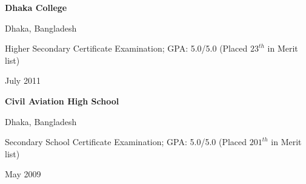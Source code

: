 	  \begin{minipage}{.75\linewidth} \begin{flushleft}
    		\textbf{Dhaka College}
    	\end{flushleft} \end{minipage}
    \hfill 
    \begin{minipage}{.20\linewidth}\begin{flushright}
    	 Dhaka, Bangladesh
    	\end{flushright}\end{minipage}
    	 \vspace{2pt}
    	\begin{minipage}{.75\linewidth} \begin{flushleft}
    		Higher Secondary Certificate Examination;  GPA: 5.0/5.0 (Placed $23^{th}$ in Merit list)\\
    	\end{flushleft} \end{minipage}
    \hfill 
    \begin{minipage}{.20\linewidth}\begin{flushright}
    	 July 2011
    	\end{flushright}\end{minipage}

    	\begin{minipage}{.75\linewidth} \begin{flushleft}
    		\textbf{Civil Aviation High School}
    	\end{flushleft} \end{minipage}
    \hfill 
    \begin{minipage}{.20\linewidth}\begin{flushright}
    	 Dhaka, Bangladesh
    	\end{flushright}\end{minipage}
    	
    	\begin{minipage}{.75\linewidth} \begin{flushleft}
    		Secondary School Certificate Examination;  GPA: 5.0/5.0 (Placed $201^{th}$ in Merit list)\\
    	\end{flushleft} \end{minipage}
    \hfill 
    \begin{minipage}{.20\linewidth}\begin{flushright}
    	 May 2009
    	\end{flushright}\end{minipage}

